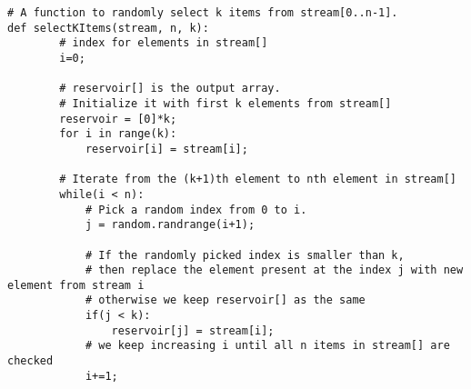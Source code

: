 \begin{lstlisting}
# A function to randomly select k items from stream[0..n-1]. 
def selectKItems(stream, n, k): 
        # index for elements in stream[] 
        i=0;  
          
        # reservoir[] is the output array. 
        # Initialize it with first k elements from stream[] 
        reservoir = [0]*k; 
        for i in range(k): 
            reservoir[i] = stream[i]; 
          
        # Iterate from the (k+1)th element to nth element in stream[]
        while(i < n): 
            # Pick a random index from 0 to i. 
            j = random.randrange(i+1); 
              
            # If the randomly picked index is smaller than k, 
            # then replace the element present at the index j with new element from stream i
            # otherwise we keep reservoir[] as the same
            if(j < k): 
                reservoir[j] = stream[i]; 
            # we keep increasing i until all n items in stream[] are checked
            i+=1; 
\end{lstlisting}
